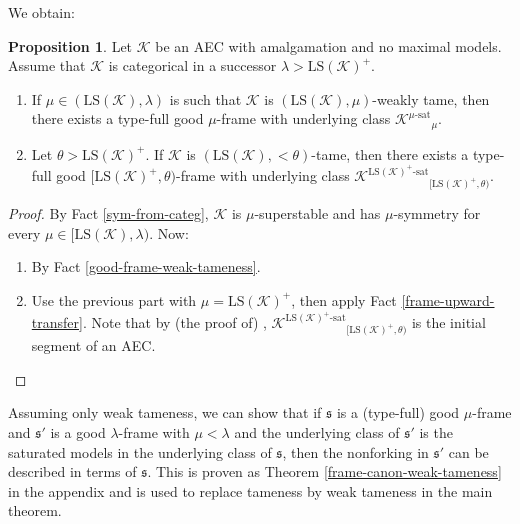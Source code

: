 \documentclass[12pt]{amsart}
\theoremstyle{definition}
\newtheorem{prop}[mydef]{Proposition}
\begin{document}
We obtain:

\begin{prop}\label{frame-existence}
  Let ${\mathcal{K}}$ be an AEC with amalgamation and no maximal models. Assume that ${\mathcal{K}}$ is categorical in a successor $\lambda > {\text{LS}} ({\mathcal{K}})^+$. 

  \begin{enumerate}
    \item If $\mu \in ({\text{LS}} ({\mathcal{K}}), \lambda)$ is such that ${\mathcal{K}}$ is $({\text{LS}} ({\mathcal{K}}), \mu)$-weakly tame, then there exists a type-full good $\mu$-frame with underlying class ${{{{\mathcal{K}}}^{{{\mu}}\text{-sat}}}}_\mu$.
    \item Let $\theta > {\text{LS}} ({\mathcal{K}})^+$. If ${\mathcal{K}}$ is $({\text{LS}} ({\mathcal{K}}), <\theta)$-tame, then there exists a type-full good $[{\text{LS}} ({\mathcal{K}})^+, \theta)$-frame with underlying class ${{{{\mathcal{K}}}^{{{{\text{LS}} ({\mathcal{K}})^+}}\text{-sat}}}}_{[{\text{LS}} ({\mathcal{K}})^+, \theta)}$.
  \end{enumerate}
\end{prop}
\begin{proof} 
  By Fact \ref{sym-from-categ}, ${\mathcal{K}}$ is $\mu$-superstable and has $\mu$-symmetry for every $\mu \in [{\text{LS}} ({\mathcal{K}}), \lambda)$. Now:
  \begin{enumerate}
    \item By Fact \ref{good-frame-weak-tameness}.
    \item Use the previous part with $\mu = {\text{LS}} ({\mathcal{K}})^+$, then apply Fact \ref{frame-upward-transfer}. Note that by (the proof of) \cite[Theorem 6.8]{vv-symmetry-transfer-v2}, ${{{{\mathcal{K}}}^{{{{\text{LS}} ({\mathcal{K}})^+}}\text{-sat}}}}_{[{\text{LS}} ({\mathcal{K}})^+, \theta)}$ is the initial segment of an AEC.
  \end{enumerate}
\end{proof}

Assuming only weak tameness, we can show that if ${\mathfrak{s}}$ is a (type-full) good $\mu$-frame and ${\mathfrak{s}}'$ is a good $\lambda$-frame with $\mu < \lambda$ and the underlying class of ${\mathfrak{s}}'$ is the saturated models in the underlying class of ${\mathfrak{s}}$, then the nonforking in ${\mathfrak{s}}'$ can be described in terms of ${\mathfrak{s}}$. This is proven as Theorem \ref{frame-canon-weak-tameness} in the appendix and is used to replace tameness by weak tameness in the main theorem.
\end{document}

